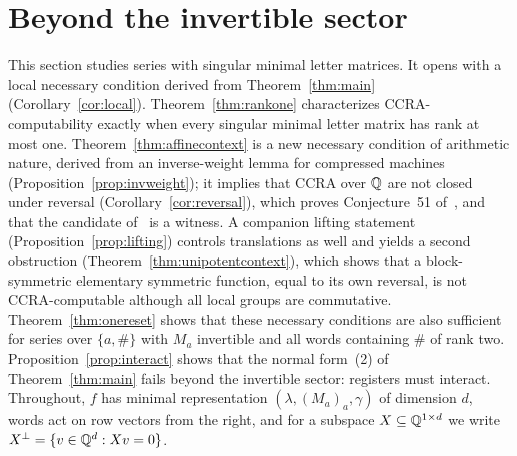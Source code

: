 \providecommand{\cZ}{\mathcal{Z}}
\section{Beyond the invertible sector}\label{sec:singular}
This section studies series with singular minimal letter matrices. It opens with a local necessary condition derived from Theorem~\ref{thm:main} (Corollary~\ref{cor:local}). Theorem~\ref{thm:rankone} characterizes CCRA-computability exactly when every singular minimal letter matrix has rank at most one. Theorem~\ref{thm:affinecontext} is a new necessary condition of arithmetic nature, derived from an inverse-weight lemma for compressed machines (Proposition~\ref{prop:invweight}); it implies that CCRA over $\mathbb{Q}$ are not closed under reversal (Corollary~\ref{cor:reversal}), which proves Conjecture~51 of~\cite{MPSfull}, and that the candidate of~\cite[Example~52]{MPSfull} is a witness. A companion lifting statement (Proposition~\ref{prop:lifting}) controls translations as well and yields a second obstruction (Theorem~\ref{thm:unipotentcontext}), which shows that a block-symmetric elementary symmetric function, equal to its own reversal, is not CCRA-computable although all local groups are commutative. Theorem~\ref{thm:onereset} shows that these necessary conditions are also sufficient for series over $\{a,\#\}$ with $M_a$ invertible and all words containing $\#$ of rank two. Proposition~\ref{prop:interact} shows that the normal form~(2) of Theorem~\ref{thm:main} fails beyond the invertible sector: registers must interact. Throughout, $f$ has minimal representation $(\lambda,(M_a)_a,\gamma)$ of dimension $d$, words act on row vectors from the right, and for a subspace $X\subseteq\mathbb{Q}^{1\times d}$ we write $X^\perp=\{v\in\mathbb{Q}^d:Xv=0\}$.

